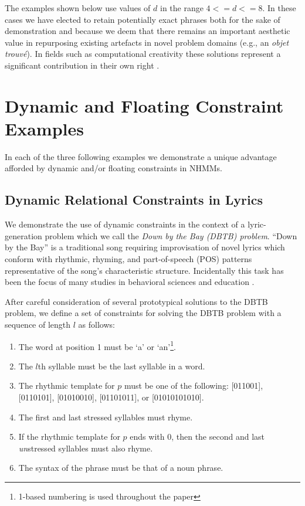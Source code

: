 \documentclass[phd,electronic,oneside,twosidetoc,letterpaper,chaptercenter,parttop,lof,lot]{byumsphd}
\begin{document}
The examples shown below use values of $d$ in the range $4 <= d <= 8$. In these cases we have elected to retain potentially exact phrases both for the sake of demonstration and because we deem that there remains an important aesthetic value in repurposing existing artefacts in novel problem domains (e.g., an \textit{objet trouv\'{e}}). In fields such as computational creativity these solutions represent a significant contribution in their own right \cite{ColtonExperimentsBrowsing}.

\section{Dynamic and Floating Constraint Examples}

In each of the three following examples we demonstrate a unique advantage afforded by dynamic and/or floating constraints in NHMMs. 

\subsection{Dynamic Relational Constraints in Lyrics}

We demonstrate the use of dynamic constraints in the context of a lyric-generation problem which we call the \textit{Down by the Bay (DBTB) problem}. ``Down by the Bay'' is a traditional song requiring improvisation of novel lyrics which conform with rhythmic, rhyming, and part-of-speech (POS) patterns representative of the song's characteristic structure. Incidentally this task has been the focus of many studies in behavioral sciences and education \cite{jalongo1997using,pasiali2004use,robb2008randomized,towell1999motivating,kolb1996read}.

After careful consideration of several prototypical solutions to the DBTB problem, we define a set of constraints for solving the DBTB problem with a sequence of length $l$ as follows:

\begin{enumerate}
\item The word at position 1 must be `a' or `an'\footnote{1-based numbering is used throughout the paper}.
\item The $l$th syllable must be the last syllable in a word.
\item The rhythmic template for $p$ must be one of the following: [011001], [0110101], [01010010], [01101011], or [01010101010].
\item \label{mandatory_rhyme_constraint}The first and last stressed syllables must rhyme.
\item \label{optional_rhyme_constraint}If the rhythmic template for $p$ ends with $0$, then the second and last \textit{un}stressed syllables must also rhyme.
\item \label{POS_floating_constraint}The syntax of the phrase must be that of a noun phrase.
\end{enumerate}
\end{document}
